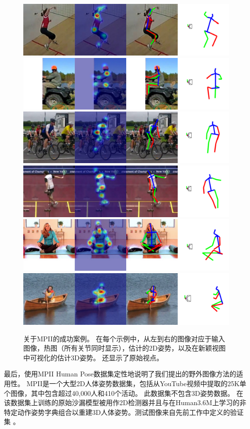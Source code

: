 \begin{figure}
  \includegraphics[width=0.48\linewidth]{figures/examples/mpii/mpii-052.pdf}
  \includegraphics[width=0.48\linewidth]{figures/examples/mpii/mpii-053.pdf}
  \includegraphics[width=0.48\linewidth]{figures/examples/mpii/mpii-057.pdf}
  \includegraphics[width=0.48\linewidth]{figures/examples/mpii/mpii-060.pdf}
  \includegraphics[width=0.48\linewidth]{figures/examples/mpii/mpii-124.pdf}
  \includegraphics[width=0.48\linewidth]{figures/examples/mpii/mpii-150.pdf}
  \caption{关于MPII\cite{andriluka14cvpr}的成功案例。 在每个示例中，从左到右的图像对应于输入图像，热图（所有关节同时显示），估计的2D姿势，以及在新颖视图中可视化的估计3D姿势。 还显示了原始视点。}\label{fig:mpii-good}
\end{figure}

最后，使用MPII Human Pose数据集\cite{andriluka14cvpr}定性地说明了我们提出的野外图像方法的适用性。 MPII是一个大型2D人体姿势数据集，包括从YouTube视频中提取的25K单个图像，其中包含超过40,000人和410个活动。 此数据集不包含3D姿势数据。
在该数据集上训练的原始沙漏模型\cite{newell2016stacked}被用作2D检测器并且与在Human3.6M上学习的非特定动作姿势字典组合以重建3D人体姿势。测试图像来自先前工作中定义的验证集 \cite{newell2016stacked}。

